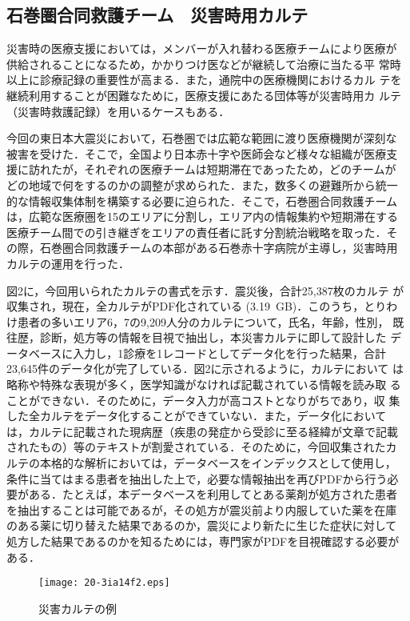 \documentclass[japanese]{jnlp_1.4}
\begin{document}
\subsection{石巻圏合同救護チーム　災害時用カルテ}

災害時の医療支援においては，メンバーが入れ替わる医療チームにより医療が
供給されることになるため，かかりつけ医などが継続して治療に当たる平
常時以上に診療記録の重要性が高まる．また，通院中の医療機関におけるカル
テを継続利用することが困難なために，医療支援にあたる団体等が災害時用カ
ルテ（災害時救護記録）を用いるケースもある．

今回の東日本大震災において，石巻圏では広範な範囲に渡り医療機関が深刻な
被害を受けた．そこで，全国より日本赤十字や医師会など様々な組織が医療支
援に訪れたが，それぞれの医療チームは短期滞在であったため，どのチームが
どの地域で何をするのかの調整が求められた．また，数多くの避難所から統一
的な情報収集体制を構築する必要に迫られた．そこで，石巻圏合同救護チーム
は，広範な医療圏を15のエリアに分割し，エリア内の情報集約や短期滞在する
医療チーム間での引き継ぎをエリアの責任者に託す分割統治戦略を取った．そ
の際，石巻圏合同救護チームの本部がある石巻赤十字病院が主導し，災害時用
カルテの運用を行った\cite{tanaka2012}．

図2に，今回用いられたカルテの書式を示す．震災後，合計25,387枚のカルテ
が収集され，現在，全カルテがPDF化されている (3.19~GB)．このうち，とりわ
け患者の多いエリア6，7の9,209人分のカルテについて，氏名，年齢，性別，
既往歴，診断，処方等の情報を目視で抽出し，本災害カルテに即して設計した
データベースに入力し，1診療を1レコードとしてデータ化を行った結果，合計
23,645件のデータ化が完了している．図2に示されるように，カルテにおいて
は略称や特殊な表現が多く，医学知識がなければ記載されている情報を読み取
ることができない．そのために，データ入力が高コストとなりがちであり，収
集した全カルテをデータ化することができていない．また，データ化において
は，カルテに記載された現病歴（疾患の発症から受診に至る経緯が文章で記載
されたもの）等のテキストが割愛されている．そのために，今回収集されたカ
ルテの本格的な解析においては，データベースをインデックスとして使用し，
条件に当てはまる患者を抽出した上で，必要な情報抽出を再びPDFから行う必
要がある．たとえば，本データベースを利用してとある薬剤が処方された患者
を抽出することは可能であるが，その処方が震災前より内服していた薬を在庫
のある薬に切り替えた結果であるのか，震災により新たに生じた症状に対して
処方した結果であるのかを知るためには，専門家がPDFを目視確認する必要が
ある．

\begin{figure}[t]
\begin{center}
\texttt{[image: 20-3ia14f2.eps]}
\end{center}
\caption{災害カルテの例}
\label{fig:record}
\end{figure}
\end{document}
